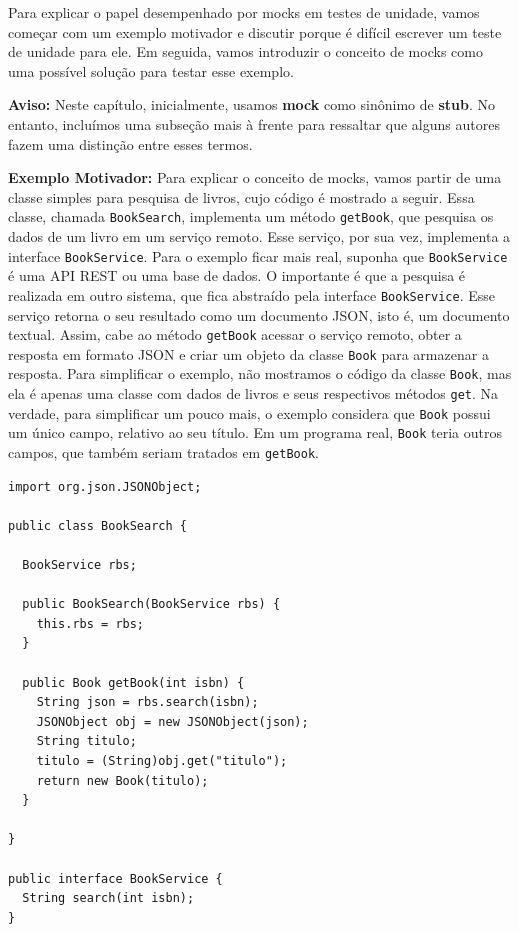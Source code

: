 \documentclass[
  11pt,
  twoside]{book}
\newcommand{\passthrough}[1]{#1}
\newenvironment{aviso}{\centering \vspace{1.5ex} \begin{tcolorbox}[breakable, colback=backcolor, width=4.9in]}{\end{tcolorbox} \vspace{1.5ex}}
\begin{document}
 

Para explicar o papel desempenhado por mocks em testes de unidade, vamos
começar com um exemplo motivador e discutir porque é difícil escrever um
teste de unidade para ele. Em seguida, vamos introduzir o conceito de
mocks como uma possível solução para testar esse exemplo.


\begin{aviso}

\textbf{Aviso:} Neste capítulo, inicialmente, usamos \textbf{mock} como
sinônimo de \textbf{stub}. No entanto, incluímos uma subseção mais à
frente para ressaltar que alguns autores fazem uma distinção entre esses
termos.

\end{aviso}

\textbf{Exemplo Motivador:} Para explicar o conceito de mocks, vamos
partir de uma classe simples para pesquisa de livros, cujo código é
mostrado a seguir. Essa classe, chamada
\passthrough{\lstinline!BookSearch!}, implementa um método
\passthrough{\lstinline!getBook!}, que pesquisa os dados de um livro em
um serviço remoto. Esse serviço, por sua vez, implementa a interface
\passthrough{\lstinline!BookService!}. Para o exemplo ficar mais real,
suponha que \passthrough{\lstinline!BookService!} é uma API REST ou uma
base de dados. O importante é que a pesquisa é realizada em outro
sistema, que fica abstraído pela interface
\passthrough{\lstinline!BookService!}. Esse serviço retorna o seu
resultado como um documento JSON, isto é, um documento textual. Assim,
cabe ao método \passthrough{\lstinline!getBook!} acessar o serviço
remoto, obter a resposta em formato JSON e criar um objeto da classe
\passthrough{\lstinline!Book!} para armazenar a resposta. Para
simplificar o exemplo, não mostramos o código da classe
\passthrough{\lstinline!Book!}, mas ela é apenas uma classe com dados de
livros e seus respectivos métodos \passthrough{\lstinline!get!}. Na
verdade, para simplificar um pouco mais, o exemplo considera que
\passthrough{\lstinline!Book!} possui um único campo, relativo ao seu
título. Em um programa real, \passthrough{\lstinline!Book!} teria outros
campos, que também seriam tratados em \passthrough{\lstinline!getBook!}.

\begin{lstlisting}
import org.json.JSONObject;

public class BookSearch {

  BookService rbs;

  public BookSearch(BookService rbs) {
    this.rbs = rbs;
  }

  public Book getBook(int isbn) {
    String json = rbs.search(isbn);
    JSONObject obj = new JSONObject(json);
    String titulo;
    titulo = (String)obj.get("titulo");
    return new Book(titulo);
  }

}

public interface BookService {
  String search(int isbn);
}
\end{lstlisting}
\end{document}
